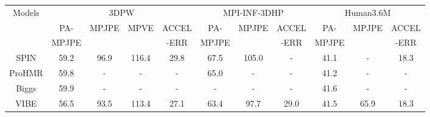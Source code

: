 \documentclass[runningheads]{llncs}
\begin{document}
\begin{table*}[t]
\begin{adjustbox}{width={\textwidth},totalheight={\textheight},keepaspectratio}

\begin{tabular}{|c|cccc|ccc|ccc|}
\hline
{Models} & \multicolumn{4}{c|}{3DPW}                                                                                                    & \multicolumn{3}{c|}{MPI-INF-3DHP}                                                   & \multicolumn{3}{c|}{Human3.6M}                                                   \\ \cline{2-11} 
                        & \multicolumn{1}{c|}{PA-}      & \multicolumn{1}{c|}{MPJPE}         & \multicolumn{1}{c|}{MPVE}           & ACCEL    & \multicolumn{1}{c|}{PA-}      & \multicolumn{1}{c|}{MPJPE}         & ACCEL & \multicolumn{1}{c|}{PA-}      & \multicolumn{1}{c|}{MPJPE}         & ACCEL \\ 
                        & \multicolumn{1}{c|}{MPJPE}      & \multicolumn{1}{c|}{ }         & \multicolumn{1}{c|}{ }           & -ERR    & \multicolumn{1}{c|}{MPJPE}      & \multicolumn{1}{c|}{ }         & -ERR & \multicolumn{1}{c|}{MPJPE}      & \multicolumn{1}{c|}{}         & -ERR \\ \hline
SPIN                    & \multicolumn{1}{c|}{59.2}          & \multicolumn{1}{c|}{96.9}          & \multicolumn{1}{c|}{116.4}          & 29.8         & \multicolumn{1}{c|}{67.5}          & \multicolumn{1}{c|}{105.0}         & -         & \multicolumn{1}{c|}{41.1}          & \multicolumn{1}{c|}{-}             & 18.3
\\ \hline
ProHMR                    & \multicolumn{1}{c|}{59.8}          & \multicolumn{1}{c|}{-}          & \multicolumn{1}{c|}{-}          & -         & \multicolumn{1}{c|}{65.0}          & \multicolumn{1}{c|}{-}         & -         & \multicolumn{1}{c|}{41.2}          & \multicolumn{1}{c|}{-}             & -      \\ \hline
Biggs                    & \multicolumn{1}{c|}{59.9}          & \multicolumn{1}{c|}{-}          & \multicolumn{1}{c|}{-}          & -         & \multicolumn{1}{c|}{-}          & \multicolumn{1}{c|}{-}         & -         & \multicolumn{1}{c|}{41.6}          & \multicolumn{1}{c|}{-}             & -      \\ \hline
VIBE                    & \multicolumn{1}{c|}{56.5}          & \multicolumn{1}{c|}{93.5}          & \multicolumn{1}{c|}{113.4}          & 27.1         & \multicolumn{1}{c|}{63.4}          & \multicolumn{1}{c|}{97.7}          & 29.0      & \multicolumn{1}{c|}{41.5}          & \multicolumn{1}{c|}{65.9}          & 18.3      \\ \hline

\end{tabular}
\end{adjustbox}
\end{table*}
\end{document}
